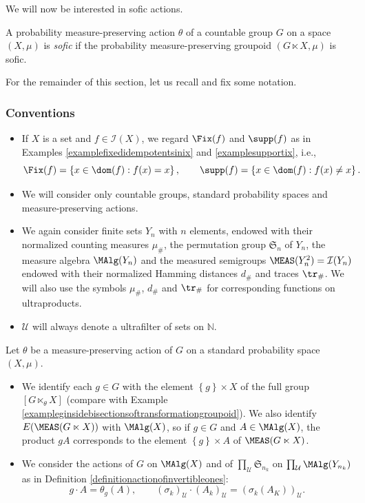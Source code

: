We will now be interested in sofic actions.

\begin{definition}
A probability measure-preserving action $\theta$ of a countable group $G$ on a space $(X,\mu)$ is \emph{sofic} if the probability measure-preserving groupoid $(G\ltimes X,\mu)$ is sofic.
\end{definition}

For the remainder of this section, let us recall and fix some notation.

\subsubsection*{Conventions}\label{conventionssoficactions}

\begin{itemize}
\item If $X$ is a set and $f\in\mathcal{I}(X)$, we regard $\Fix(f)$ and $\supp(f)$ as in Examples \ref{examplefixedidempotentsinix} and \ref{examplesupportix}, i.e.,
\[\Fix(f)=\left\{x\in\dom(f):f(x)=x\right\},\qquad\supp(f)=\left\{x\in\dom(f):f(x)\neq x\right\}.\]
\item We will consider only countable groups, standard probability spaces and measure-preserving actions.
\item We again consider finite sets $Y_n$ with $n$ elements, endowed with their normalized counting measures $\mu_\#$, the permutation group $\mathfrak{S}_n$ of $Y_n$, the measure algebra $\MAlg(Y_n)$ and the measured semigroups $\MEAS(Y_n^2)=\mathcal{I}(Y_n)$ endowed with their normalized Hamming distances $d_\#$ and traces $\tr_\#$. We will also use the symbols $\mu_\#$, $d_\#$ and $\tr_\#$ for corresponding functions on ultraproducts.
\item $\mathcal{U}$ will always denote a ultrafilter of sets on $\mathbb{N}$.
\end{itemize}
Let $\theta$ be a measure-preserving action of $G$ on a standard probability space $(X,\mu)$.
\begin{itemize}
\item We identify each $g\in G$ with the element $\left\{g\right\}\times X$ of the full group $[G\ltimes_\theta X]$ (compare with Example \ref{exampleginsidebisectionsoftransformationgroupoid}). We also identify $E(\MEAS(G\ltimes X))$ with  $\MAlg(X)$, so if $g\in G$ and $A\in\MAlg(X)$, the product $gA$ corresponds to the element $\left\{g\right\}\times A$ of $\MEAS(G\ltimes X)$.
\item We consider the actions of $G$ on $\MAlg(X)$ and of $\prod_\mathcal{U}\mathfrak{S}_{n_k}$ on $\prod_\mathcal{U}\MAlg(Y_{n_k})$ as in Definition \ref{definitionactionofinvertibleones}:
\[g\cdot A=\theta_g(A),\qquad(\sigma_k)_\mathcal{U}\cdot(A_k)_\mathcal{U}=(\sigma_k(A_K))_\mathcal{U}.\]
\end{itemize}

